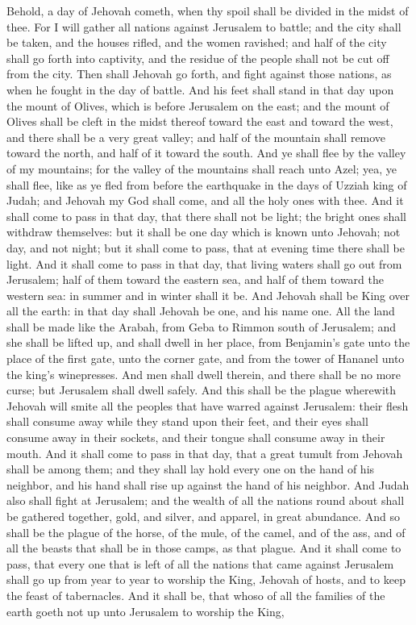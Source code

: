 Behold, a day of Jehovah cometh, when thy spoil shall be divided in the midst of thee. For I will gather all nations against Jerusalem to battle; and the city shall be taken, and the houses rifled, and the women ravished; and half of the city shall go forth into captivity, and the residue of the people shall not be cut off from the city. Then shall Jehovah go forth, and fight against those nations, as when he fought in the day of battle. And his feet shall stand in that day upon the mount of Olives, which is before Jerusalem on the east; and the mount of Olives shall be cleft in the midst thereof toward the east and toward the west, and there shall be a very great valley; and half of the mountain shall remove toward the north, and half of it toward the south. And ye shall flee by the valley of my mountains; for the valley of the mountains shall reach unto Azel; yea, ye shall flee, like as ye fled from before the earthquake in the days of Uzziah king of Judah; and Jehovah my God shall come, and all the holy ones with thee. And it shall come to pass in that day, that there shall not be light; the bright ones shall withdraw themselves: but it shall be one day which is known unto Jehovah; not day, and not night; but it shall come to pass, that at evening time there shall be light. And it shall come to pass in that day, that living waters shall go out from Jerusalem; half of them toward the eastern sea, and half of them toward the western sea: in summer and in winter shall it be.  And Jehovah shall be King over all the earth: in that day shall Jehovah be one, and his name one. All the land shall be made like the Arabah, from Geba to Rimmon south of Jerusalem; and she shall be lifted up, and shall dwell in her place, from Benjamin’s gate unto the place of the first gate, unto the corner gate, and from the tower of Hananel unto the king’s winepresses. And men shall dwell therein, and there shall be no more curse; but Jerusalem shall dwell safely.  And this shall be the plague wherewith Jehovah will smite all the peoples that have warred against Jerusalem: their flesh shall consume away while they stand upon their feet, and their eyes shall consume away in their sockets, and their tongue shall consume away in their mouth. And it shall come to pass in that day, that a great tumult from Jehovah shall be among them; and they shall lay hold every one on the hand of his neighbor, and his hand shall rise up against the hand of his neighbor. And Judah also shall fight at Jerusalem; and the wealth of all the nations round about shall be gathered together, gold, and silver, and apparel, in great abundance. And so shall be the plague of the horse, of the mule, of the camel, and of the ass, and of all the beasts that shall be in those camps, as that plague.  And it shall come to pass, that every one that is left of all the nations that came against Jerusalem shall go up from year to year to worship the King, Jehovah of hosts, and to keep the feast of tabernacles. And it shall be, that whoso of all the families of the earth goeth not up unto Jerusalem to worship the King, 